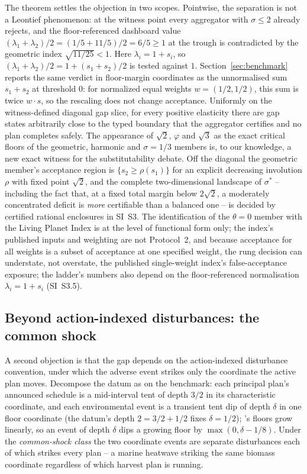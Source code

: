 The theorem settles the objection in two scopes. Pointwise, the separation is not a Leontief phenomenon: at the witness point every aggregator with $\sigma\le2$ already rejects, and the floor-referenced dashboard value $(\lambda_1+\lambda_2)/2=(1/5+11/5)/2=6/5\ge1$ at the trough is contradicted by the geometric index $\sqrt{11/25}<1$. Here $\lambda_i=1+s_i$, so $(\lambda_1+\lambda_2)/2=1+(s_1+s_2)/2$ is tested against $1$. Section~\ref{sec:benchmark} reports the same verdict in floor-margin coordinates as the unnormalised sum $s_1+s_2$ at threshold $0$: for normalized equal weights $w=(1/2,1/2)$, this sum is twice $w\cdot s$, so the rescaling does not change acceptance. Uniformly on the witness-defined diagonal gap slice, for every positive elasticity there are gap states arbitrarily close to the typed boundary that the aggregator certifies and no plan completes safely. The appearance of $\sqrt2$, $\varphi$ and $\sqrt3$ as the exact critical floors of the geometric, harmonic and $\sigma=1/3$ members is, to our knowledge, a new exact witness for the substitutability debate. Off the diagonal the geometric member's acceptance region is $\{s_2\ge\rho(s_1)\}$ for an explicit decreasing involution $\rho$ with fixed point $\sqrt2$, and the complete two-dimensional landscape of $\sigma^*$ -- including the fact that, at a fixed total margin below $2\sqrt2$, a moderately concentrated deficit is \emph{more} certifiable than a balanced one -- is decided by certified rational enclosures in SI~S3. The identification of the $\theta=0$ member with the Living Planet Index is at the level of functional form only; the index's published inputs and weighting are not Protocol~2, and because acceptance for all weights is a subset of acceptance at one specified weight, the rung decision can understate, not overstate, the published single-weight index's false-acceptance exposure; the ladder's numbers also depend on the floor-referenced normalisation $\lambda_i=1+s_i$ (SI~S3.5).

\subsection{Beyond action-indexed disturbances: the common shock}\label{sec:commonshock}

A second objection is that the gap depends on the action-indexed disturbance convention, under which the adverse event strikes only the coordinate the active plan moves. Decompose the datum as on the benchmark: each principal plan's announced schedule is a mid-interval tent of depth $3/2$ in its characteristic coordinate, and each environmental event is a transient tent dip of depth $\delta$ in one floor coordinate (the datum's depth $2=3/2+1/2$ fixes $\delta=1/2$); 's floors grow linearly, so an event of depth $\delta$ dips a growing floor by $\max(0,\delta-1/8)$. Under the \emph{common-shock class} the two coordinate events are separate disturbances each of which strikes every plan -- a marine heatwave striking the same biomass coordinate regardless of which harvest plan is running.

